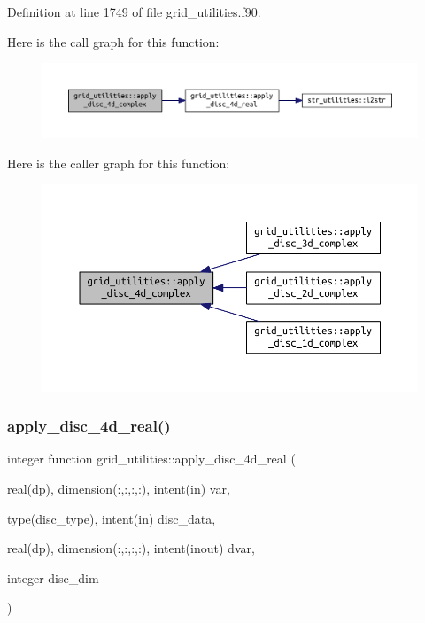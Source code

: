 Definition at line 1749 of file grid\+\_\+utilities.\+f90.

Here is the call graph for this function\+:
\nopagebreak
\begin{figure}[H]
\begin{center}
\leavevmode
\includegraphics[width=350pt]{namespacegrid__utilities_a7fcde4b046076294fc8d2ca130f84add_cgraph}
\end{center}
\end{figure}
Here is the caller graph for this function\+:
\nopagebreak
\begin{figure}[H]
\begin{center}
\leavevmode
\includegraphics[width=350pt]{namespacegrid__utilities_a7fcde4b046076294fc8d2ca130f84add_icgraph}
\end{center}
\end{figure}
\mbox{\label{namespacegrid__utilities_a9494e086550e67e6d1319d94d37e15ef}} 
\subsubsection{\texorpdfstring{apply\+\_\+disc\+\_\+4d\+\_\+real()}{apply\_disc\_4d\_real()}}
{\footnotesize\ttfamily integer function grid\+\_\+utilities\+::apply\+\_\+disc\+\_\+4d\+\_\+real (\begin{DoxyParamCaption}\item[{real(dp), dimension(\+:,\+:,\+:,\+:), intent(in)}]{var,  }\item[{type(disc\+\_\+type), intent(in)}]{disc\+\_\+data,  }\item[{real(dp), dimension(\+:,\+:,\+:,\+:), intent(inout)}]{dvar,  }\item[{integer}]{disc\+\_\+dim }\end{DoxyParamCaption})}



